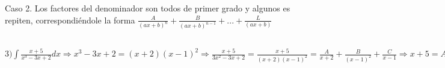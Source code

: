 \documentclass[12pt]{report}
\begin{document}
    Caso 2. Los factores del denominador son todos de primer grado y algunos es repiten, correspondiéndole la forma $\frac{A}{(ax + b)^n} + \frac{B}{(ax+b)^{n-1}} +...+ \frac{L}{(ax+b)}$
    
    $3) \int\frac{x+5}{x^3-3x+2}dx \Rightarrow x^3-3x+2 = (x+2)(x-1)^2 \Rightarrow \frac{x+5}{3x^2-3x+2} = \frac{x+5}{(x+2)(x-1)^2} = \frac{A}{x+2} + \frac{B}{(x-1)^2} + \frac{C}{x-1} \Rightarrow x + 5 = A(x-1)^2 + B(x+2) + C(x+2)(x-1) = A(x^2-2x+1) + B(x+2) + C(x^2+x-2) = x^2(A + C) + x(-2A + B + C) + (A + 2B - 2C) \Rightarrow
    \begin{bmatrix}
        1 & 0 & 1 & 0 \\
        -2 & 1 & 1 & 1 \\
        1 & 2 & -2 & 5 \\
    \end{bmatrix} \sim 2R_1 + R_2, -1R_1 + R_3\sim 
    \begin{bmatrix}
        1 & 0 & 1 & 0 \\
        0 & 1 & 3 & 1 \\
        0 & 2 & -3 & 5 \\
    \end{bmatrix} \sim -2R_2 + R_3\sim 
    \begin{bmatrix}
        1 & 0 & 1 & 0 \\
        0 & 1 & 3 & 1 \\
        0 & 0 & -9 & 3 \\
    \end{bmatrix}
    \Rightarrow -9C = 3 \Rightarrow C = -3/9 \Rightarrow \boxed{C = -1/3} \Rightarrow B + 3C = 1 \Rightarrow B - 1 = 1 \Rightarrow \boxed{B = 2} \Rightarrow A + C  = 0 \Rightarrow A = -C \Rightarrow \boxed{A = 1/3} \Longrightarrow I = \int\frac{x+5}{x^3-3x+2}dx =\int\frac{1/3}{x+2}dx + \int\frac{2}{(x-1)^2}dx + \int\frac{-1/3}{x-1}dx = \frac{1}{3}\ln|x+2| - \frac{2}{x-1} - \frac{1}{3}\ln|x-1| + C = \frac{1}{3}\ln\frac{x+2}{x-1}-\frac{2}{x-1} + C = \boxed{\ln|\frac{x+2}{x-1}|^{\frac{1}{3}} - \frac{2}{x-1} + C}$
\end{document}
